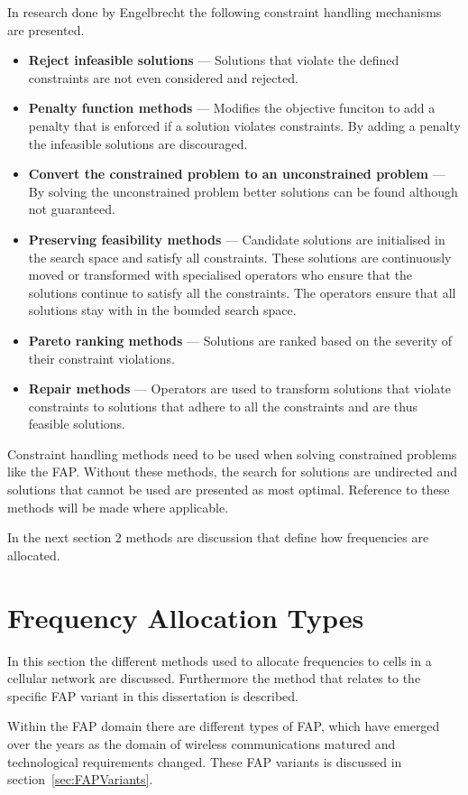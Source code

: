 In research done by Engelbrecht\cite{CompuIntelligenceIntro} the following constraint handling mechanisms are presented.
\begin{itemize}
\item{\textbf{Reject infeasible solutions}} --- Solutions that violate the defined constraints are not even considered and rejected.
\item{\textbf{Penalty function methods}} --- Modifies the objective funciton to add a penalty that is enforced if a solution violates constraints. By adding a penalty the infeasible solutions are discouraged.
\item{\textbf{Convert the constrained problem to an unconstrained problem}} --- By solving the unconstrained problem better solutions can be found although not guaranteed.
\item{\textbf{Preserving feasibility methods}} --- Candidate solutions are initialised in the search space and satisfy all constraints. These solutions are continuously moved or transformed with specialised operators who ensure that the solutions continue to satisfy all the constraints. The operators ensure that all solutions stay with in the bounded search space.
\item{\textbf{Pareto ranking methods}} --- Solutions are ranked based on the severity of their constraint violations.
\item{\textbf{Repair methods}} --- Operators are used to transform solutions that violate constraints to solutions that adhere to all the constraints and are thus feasible solutions.
\end{itemize}

Constraint handling methods need to be used when solving constrained problems like the \gls{FAP}. Without these methods, the search for solutions are undirected and solutions that cannot be used are presented as most optimal. Reference to these methods will be made where applicable.

In the next section 2 methods are discussion that define how frequencies are allocated.
\section{Frequency Allocation Types}
\label{sec:FreqAssignmentTypes}
In this section the different methods used to allocate frequencies to cells in a cellular network are discussed. Furthermore the method that relates to the specific \gls{FAP} variant in this dissertation is described.

Within the \gls{FAP} domain there are different types of \gls{FAP}, which have emerged over the years as the domain of wireless communications matured and technological requirements changed. These \gls{FAP} variants is discussed in section~\ref{sec:FAPVariants}.

